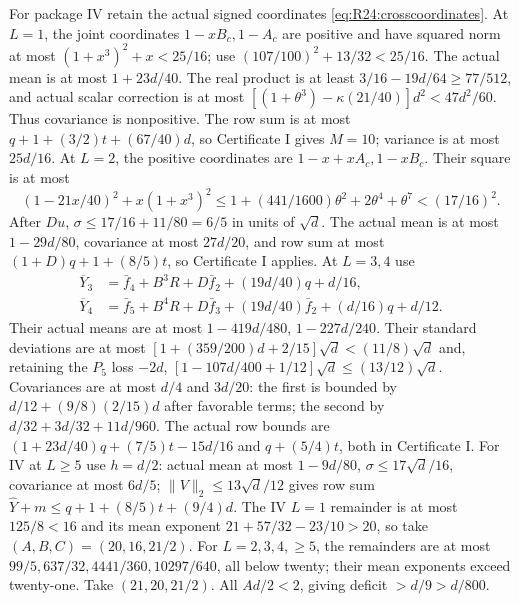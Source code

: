 For package IV retain the actual signed coordinates
\eqref{eq:R24:crosscoordinates}.
At $L=1$, the joint coordinates $1-xB_c,1-A_c$ are positive and
have squared norm at most $(1+x^3)^2+x<25/16$;
use $(107/100)^2+13/32<25/16$.
The actual mean is at most $1+23d/40$.
The real product is at least $3/16-19d/64\ge77/512$, and actual
scalar correction is at most
$[(1+\theta^3)-\kappa(21/40)]d^2<47d^2/60$.
Thus covariance is nonpositive. The row sum is at most
$q+1+(3/2)t+(67/40)d$, so Certificate I gives $M=10$;
variance is at most $25d/16$.
At $L=2$, the positive coordinates are $1-x+xA_c,1-xB_c$.
Their square is at most
\[
(1-21x/40)^2+x(1+x^3)^2
\le1+(441/1600)\theta^2+2\theta^4+\theta^7<(17/16)^2.
\]
After $Du$, $\sigma\le17/16+11/80=6/5$ in units of $\sqrt d$.
The actual mean is at most $1-29d/80$, covariance at most $27d/20$,
and row sum at most $(1+D)q+1+(8/5)t$, so Certificate I applies.
At $L=3,4$ use
\[
\begin{aligned}
\overline Y_3&=\bar f_4+B^3R+D\bar f_2+(19d/40)q+d/16,\\
\overline Y_4&=\bar f_5+B^4R+D\bar f_3+(19d/40)\bar f_2+(d/16)q+d/12.
\end{aligned}
\]
Their actual means are at most $1-419d/480$, $1-227d/240$.
Their standard deviations are at most
$[1+(359/200)d+2/15]\sqrt d<(11/8)\sqrt d$ and,
retaining the $P_5$ loss $-2d$,
$[1-107d/400+1/12]\sqrt d\le(13/12)\sqrt d$.
Covariances are at most $d/4$ and $3d/20$:
the first is bounded by $d/12+(9/8)(2/15)d$ after favorable terms;
the second by $d/32+3d/32+11d/960$.
The actual row bounds are
$(1+23d/40)q+(7/5)t-15d/16$ and $q+(5/4)t$, both in Certificate I.
For IV at $L\ge5$ use $h=d/2$: actual mean at most $1-9d/80$,
$\sigma\le17\sqrt d/16$, covariance at most $6d/5$;
$\|V\|_2\le13\sqrt d/12$ gives row sum
$\widehat Y+m\le q+1+(8/5)t+(9/4)d$.
The IV $L=1$ remainder is at most $125/8<16$ and its mean exponent
$21+57/32-23/10>20$, so take $(A,B,C)=(20,16,21/2)$.
For $L=2,3,4,\ge5$, the remainders are at most
$99/5,637/32,4441/360,10297/640$, all below twenty;
their mean exponents exceed twenty-one. Take $(21,20,21/2)$.
All $Ad/2<2$, giving deficit $>d/9>d/800$.

